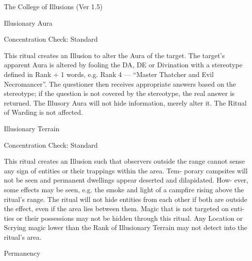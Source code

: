 \begin{Chapter}{The College of Illusions (Ver 1.5)}
\begin{effects}
\end{effects}
\begin{ritual}[R-1]{Illusionary Aura }

Concentration Check: Standard 
\begin{effects}
 This  ritual  creates  an  Illusion  to  alter  the 
Aura  of  the  target.  The  target’s  apparent  Aura  is 
altered by fooling the DA, DE or Divination with a 
stereotype defined in Rank + 1 words, e.g. Rank 4 
—  “Master  Thatcher  and  Evil  Necromancer”.  The 
questioner then receives appropriate answers based 
on the stereotype; if the question is not covered by 
the  stereotype,  the  real  answer  is  returned.  The 
Illusory  Aura  will  not  hide  information,  merely 
alter it. The Ritual of Warding is not affected. 

\end{effects}
\end{ritual}

\begin{ritual}[R-2]{Illusionary Terrain }

Concentration Check: Standard 
\begin{effects}
 This  ritual  creates  an  Illusion  such  that 
observers  outside  the  range  cannot  sense  any  sign 
of  entities  or  their trappings  within  the  area.  Tem-
porary  campsites  will  not  be  seen  and  permanent 
dwellings  appear  deserted  and  dilapidated.  How-
ever, some effects may be seen, e.g. the smoke and 
light  of  a  campfire  rising  above  the  ritual’s  range. 
The  ritual  will  not  hide  entities  from each  other  if 
both  are  outside  the  effect,  even  if  the  area  lies 
between  them.  Magic  that  is  not  targeted  on  enti-
ties or their possessions may not be hidden through 
this  ritual.  Any  Location  or  Scrying  magic  lower 
than the Rank of Illusionary Terrain may not detect 
into the ritual’s area. 

\end{effects}
\end{ritual}

\begin{ritual}[R-3]{Permanency }


\end{ritual}
\end{Chapter}
